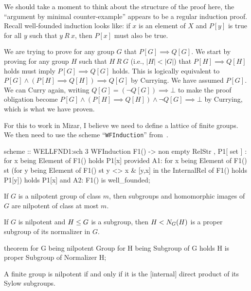 \begin{thm-remark}
We should take a moment to think about the structure of the proof here,
the ``argument by minimal counter-example'' appears to be a regular
induction proof. Recall well-founded induction looks like: if $x$ is an
element of $X$ and $P[y]$ is true for all $y$ such that $y~R~x$, then
$P[x]$ must also be true.

We are trying to prove for any group $G$ that $P[G]\implies Q[G]$.
We start by proving for any group $H$ such that $H~R~G$ (i.e., $|H|<|G|$)
that $P[H]\implies Q[H]$ holds must imply $P[G]\implies Q[G]$ holds.
This is logically equivalent to $P[G]\land(P[H]\implies Q[H])\implies Q[G]$ 
by Currying. We have assumed $P[G]$. We can Curry again, writing
$Q[G]=(\neg Q[G])\implies\bot$ to make the proof obligation become
$P[G]\land(P[H]\implies Q[H])\land\neg Q[G]\implies\bot$ by Currying,
which is what we have proven.

For this to work in Mizar, I believe we need to define a lattice of
finite groups. We then need to use the scheme ``\lstinline{WFInduction}''
from~.
\end{thm-remark}

\begin{mizar}
scheme :: WELLFND1:sch 3
WFInduction{ F1() -> non empty RelStr , P1[ set ] } :
  for x being Element of F1() holds P1[x]
provided
  A1: for x being Element of F1()
      st (for y being Element of F1()
          st y <> x & [y,x] in the InternalRel of F1()
          holds P1[y])
      holds P1[x] and
  A2: F1() is well_founded;
\end{mizar}

\begin{theorem}
If $G$ is a nilpotent group of class $m$, then subgroups and homomorphic
images of $G$ are nilpotent of class at most $m$.
\end{theorem}

\begin{theorem}
If $G$ is nilpotent and $H\leq G$ is a subgroup,
then $H< N_{G}(H)$ is a proper subgroup of its normalizer
in $G$.
\end{theorem}

\begin{mizar}
theorem
  for G being nilpotent Group
  for H being Subgroup of G
  holds H is proper Subgroup of Normalizer H;
\end{mizar}

\begin{theorem}
A finite group is nilpotent if and only if it is the [internal] direct
product of its Sylow subgroups.
\end{theorem}

